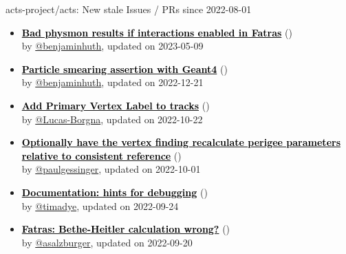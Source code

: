 \begin{frame}[allowframebreaks]{ acts-project/acts: New stale Issues / PRs since 2022-08-01 }
\begin{itemize}
    \item\iss\prstale\textbf{\href{https://github.com/acts-project/acts/issues/1643}{\textcolor{black}{Bad physmon results if interactions enabled in Fatras}}}
    (\href{https://github.com/acts-project/acts/issues/1643}{}) \\
    by \href{https://github.com/benjaminhuth}{@benjaminhuth}, updated on 2023-05-09

    \item\iss\prstale\textbf{\href{https://github.com/acts-project/acts/issues/1603}{\textcolor{black}{Particle smearing assertion with Geant4}}}
    (\href{https://github.com/acts-project/acts/issues/1603}{}) \\
    by \href{https://github.com/benjaminhuth}{@benjaminhuth}, updated on 2022-12-21

    \item\iss\prstale\textbf{\href{https://github.com/acts-project/acts/issues/1544}{\textcolor{black}{Add Primary Vertex Label to tracks}}}
    (\href{https://github.com/acts-project/acts/issues/1544}{}) \\
    by \href{https://github.com/Lucas-Borgna}{@Lucas-Borgna}, updated on 2022-10-22

    \item\iss\prstale\textbf{\href{https://github.com/acts-project/acts/issues/1482}{\textcolor{black}{Optionally have the vertex finding recalculate perigee parameters relative to consistent reference}}}
    (\href{https://github.com/acts-project/acts/issues/1482}{}) \\
    by \href{https://github.com/paulgessinger}{@paulgessinger}, updated on 2022-10-01

    \item\iss\prstale\textbf{\href{https://github.com/acts-project/acts/issues/1463}{\textcolor{black}{Documentation: hints for debugging}}}
    (\href{https://github.com/acts-project/acts/issues/1463}{}) \\
    by \href{https://github.com/timadye}{@timadye}, updated on 2022-09-24

    \item\iss\prstale\textbf{\href{https://github.com/acts-project/acts/issues/1437}{\textcolor{black}{Fatras: Bethe-Heitler calculation wrong?}}}
    (\href{https://github.com/acts-project/acts/issues/1437}{}) \\
    by \href{https://github.com/asalzburger}{@asalzburger}, updated on 2022-09-20


\end{itemize}
\end{frame}
